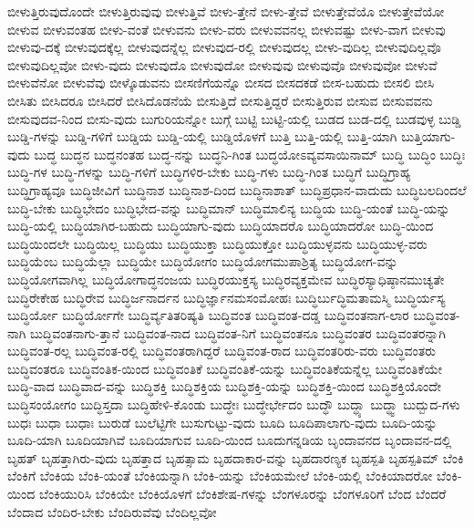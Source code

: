 {ಬೀಳುತ್ತಿರುವುದೊಂದೇ
ಬೀಳುತ್ತಿರುವುವು
ಬೀಳುತ್ತಿವೆ
ಬೀಳು-ತ್ತೇನೆ
ಬೀಳು-ತ್ತೇವೆ
ಬೀಳುತ್ತೇವೆಯೊ
ಬೀಳುತ್ತೇವೆಯೋ
ಬೀಳುವ
ಬೀಳುವಂತಹ
ಬೀಳು-ವಂತೆ
ಬೀಳುವನು
ಬೀಳು-ವರು
ಬೀಳುವವನಲ್ಲ
ಬೀಳುವಷ್ಟು
ಬೀಳು-ವಾಗ
ಬೀಳುವು
ಬೀಳುವು-ದಕ್ಕೆ
ಬೀಳುವುದಕ್ಕೆಲ್ಲ
ಬೀಳುವುದನ್ನೆಲ್ಲ
ಬೀಳುವುದ-ರಲ್ಲಿ
ಬೀಳುವುದಲ್ಲ
ಬೀಳು-ವುದಿಲ್ಲ
ಬೀಳುವುದಿಲ್ಲವೊ
ಬೀಳುವುದಿಲ್ಲವೋ
ಬೀಳು-ವುದು
ಬೀಳುವುದೊ
ಬೀಳುವುದೋ
ಬೀಳುವುವು
ಬೀಳುವುವೊ
ಬೀಳುವುವೋ
ಬೀಳುವೆ
ಬೀಳುವೆನೋ
ಬೀಳುವೆವು
ಬೀಳ್ಕೊಡುವನು
ಬೀಸಣಿಗೆಯನ್ನೊ
ಬೀಸದ
ಬೀಸದಕಡೆ
ಬೀಸ-ಬಹುದು
ಬೀಸಲಿ
ಬೀಸಿ
ಬೀಸಿತು
ಬೀಸಿದರೂ
ಬೀಸಿದರೆ
ಬೀಸಿದೊಡನೆಯೆ
ಬೀಸುತ್ತಿದೆ
ಬೀಸುತ್ತಿದ್ದರೆ
ಬೀಸುತ್ತಿರುವ
ಬೀಸುವ
ಬೀಸುವವನು
ಬೀಸುವುದವ-ನಿಂದ
ಬೀಸು-ವುದು
ಬುಗುರಿಯನ್ನೋ
ಬುಗ್ಗೆ
ಬುಟ್ಟಿ
ಬುಟ್ಟಿ-ಯಲ್ಲಿ
ಬುಡದ
ಬುಡ-ದಲ್ಲಿ
ಬುಡವುಳ್ಳ
ಬುಡ್ಡಿ
ಬುಡ್ಡಿ-ಗಳನ್ನು
ಬುಡ್ಡಿ-ಗಳಿಗೆ
ಬುಡ್ಡಿಯ
ಬುಡ್ಡಿ-ಯಲ್ಲಿ
ಬುಡ್ಡಿಯೊಳಗೆ
ಬುತ್ತಿ
ಬುತ್ತಿ-ಯಲ್ಲಿ
ಬುತ್ತಿ-ಯಾಗಿ
ಬುತ್ತಿಯಾಗು-ವುದು
ಬುದ್ಧ
ಬುದ್ಧನ
ಬುದ್ಧನಂತಹ
ಬುದ್ಧ-ನನ್ನು
ಬುದ್ಧನಿ-ಗಿಂತ
ಬುದ್ಧಯೋಽವ್ಯವಸಾಯಿನಾಮ್
ಬುದ್ಧಿ
ಬುದ್ಧಿಂ
ಬುದ್ಧಿಃ
ಬುದ್ಧಿ-ಗಳ
ಬುದ್ಧಿ-ಗಳನ್ನು
ಬುದ್ಧಿ-ಗಳಿಗೆ
ಬುದ್ಧಿಗಳಿರ-ಬೇಕು
ಬುದ್ಧಿ-ಗಳು
ಬುದ್ಧಿ-ಗಿಂತ
ಬುದ್ಧಿಗೆ
ಬುದ್ಧಿಗ್ರಾಹ್ಯ
ಬುದ್ಧಿಗ್ರಾಹ್ಯವೂ
ಬುದ್ಧಿಜೀವಿಗೆ
ಬುದ್ಧಿನಾಶ
ಬುದ್ಧಿನಾಶ-ದಿಂದ
ಬುದ್ಧಿನಾಶಾತ್
ಬುದ್ಧಿಪ್ರಧಾನ-ವಾದುದು
ಬುದ್ಧಿಬಲದಿಂದಲೆ
ಬುದ್ಧಿ-ಬೇಕು
ಬುದ್ಧಿಭೇದಂ
ಬುದ್ಧಿಭೇದ-ವನ್ನು
ಬುದ್ಧಿಮಾನ್
ಬುದ್ಧಿಮಾಲಿನ್ಯ
ಬುದ್ಧಿಯ
ಬುದ್ಧಿ-ಯಂತೆ
ಬುದ್ಧಿ-ಯನ್ನು
ಬುದ್ಧಿ-ಯಲ್ಲಿ
ಬುದ್ಧಿಯಾಗಿರ-ಬಹುದು
ಬುದ್ಧಿಯಾಗು-ವುದು
ಬುದ್ಧಿಯಾದರೊ
ಬುದ್ಧಿಯಾದರೋ
ಬುದ್ಧಿ-ಯಿಂದ
ಬುದ್ಧಿಯಿಂದಲೇ
ಬುದ್ಧಿಯಿಲ್ಲ
ಬುದ್ಧಿಯು
ಬುದ್ಧಿಯುಕ್ತಾ
ಬುದ್ಧಿಯುಕ್ತೋ
ಬುದ್ಧಿಯುಳ್ಳವನು
ಬುದ್ಧಿಯುಳ್ಳ-ವರು
ಬುದ್ಧಿಯೆಂಬ
ಬುದ್ಧಿಯೆಲ್ಲಾ
ಬುದ್ಧಿಯೇ
ಬುದ್ಧಿಯೋಗಂ
ಬುದ್ಧಿಯೋಗಮುಪಾಶ್ರಿತ್ಯ
ಬುದ್ಧಿಯೋಗ-ವನ್ನು
ಬುದ್ಧಿಯೋಗವಾಗಿಲ್ಲ
ಬುದ್ಧಿಯೋಗಾದ್ಧನಂಜಯ
ಬುದ್ಧಿರಯುಕ್ತಸ್ಯ
ಬುದ್ಧಿರವ್ಯಕ್ತಮೇವ
ಬುದ್ಧಿರಸ್ಯಾಧಿಷ್ಠಾನಮುಚ್ಯತೇ
ಬುದ್ಧಿರೇಕೇಹ
ಬುದ್ಧಿರೇವ
ಬುದ್ಧಿರ್ಜನಾರ್ದನ
ಬುದ್ಧಿರ್ಜ್ಞಾನಮಸಂಮೋಹಃ
ಬುದ್ಧಿರ್ಬುದ್ಧಿಮತಾಮಸ್ಮಿ
ಬುದ್ಧಿರ್ಯಸ್ಯ
ಬುದ್ಧಿರ್ಯೋ
ಬುದ್ಧಿರ್ಯೋಗೇ
ಬುದ್ಧಿರ್ವ್ಯತಿತರಿಷ್ಯತಿ
ಬುದ್ಧಿವಂತ
ಬುದ್ಧಿವಂತ-ದಡ್ಡ
ಬುದ್ಧಿವಂತನಾಗ-ಲಾರ
ಬುದ್ಧಿವಂತ-ನಾಗಿ
ಬುದ್ಧಿವಂತನಾಗು-ತ್ತಾನೆ
ಬುದ್ಧಿವಂತ-ನಾದ
ಬುದ್ಧಿವಂತ-ನಿಗೆ
ಬುದ್ಧಿವಂತನೂ
ಬುದ್ಧಿವಂತರ
ಬುದ್ಧಿವಂತರನ್ನಾಗಿ
ಬುದ್ಧಿವಂತ-ರಲ್ಲ
ಬುದ್ಧಿವಂತ-ರಲ್ಲಿ
ಬುದ್ಧಿವಂತರಾಗಿದ್ದರೆ
ಬುದ್ಧಿವಂತ-ರಾದ
ಬುದ್ಧಿವಂತರಿರು-ವರು
ಬುದ್ಧಿವಂತರು
ಬುದ್ಧಿವಂತರೂ
ಬುದ್ಧಿವಂತಿಕ-ಯಿಂದ
ಬುದ್ಧಿವಂತಿಕೆ
ಬುದ್ಧಿವಂತಿಕೆ-ಯನ್ನು
ಬುದ್ಧಿವಂತಿಕೆಯನ್ನೆಲ್ಲ
ಬುದ್ಧಿವಂತಿಕೆಯೇ
ಬುದ್ಧಿ-ವಾದ
ಬುದ್ಧಿವಾದ-ವನ್ನು
ಬುದ್ಧಿಶಕ್ತಿ
ಬುದ್ಧಿಶಕ್ತಿಯ
ಬುದ್ಧಿಶಕ್ತಿ-ಯನ್ನು
ಬುದ್ಧಿಶಕ್ತಿ-ಯಿಂದ
ಬುದ್ಧಿಶಕ್ತಿಯೊಂದೇ
ಬುದ್ಧಿಸಂಯೋಗಂ
ಬುದ್ಧಿಸ್ತದಾ
ಬುದ್ಧಿಹೇಳಿ-ಕೊಂಡು
ಬುದ್ಧೇಃ
ಬುದ್ಧೇರ್ಭೇದಂ
ಬುದ್ಧೌ
ಬುದ್ಧ್ಯಾ
ಬುದ್ಧ್ವಾ
ಬುದ್ಬುದ-ಗಳು
ಬುಧಃ
ಬುಧಾ
ಬುಧಾಃ
ಬುರುಡೆ
ಬುಲೆಟ್ಟಿಗೇ
ಬುಸುಗುಟ್ಟು-ವುದು
ಬೂದಿ
ಬೂದಿಪಾಲಾಗು-ವುದು
ಬೂದಿ-ಯನ್ನು
ಬೂದಿ-ಯಾಗಿ
ಬೂದಿಯಾಗಿವೆ
ಬೂದಿಯಾಗುವ
ಬೂದಿ-ಯಿಂದ
ಬೂದುಗನ್ನಡಿಯ
ಬೃಂದಾವನದ
ಬೃಂದಾವನ-ದಲ್ಲಿ
ಬೃಹತ್
ಬೃಹತ್ತಾಗಿರು-ವುದು
ಬೃಹತ್ತಾದ
ಬೃಹತ್ಸಾಮ
ಬೃಹದಾಕಾರ-ವನ್ನು
ಬೃಹದಾರಣ್ಯಕ
ಬೃಹಸ್ಪತಿ
ಬೃಹಸ್ಪತಿಮ್
ಬೆಂಕಿ
ಬೆಂಕಿಗೆ
ಬೆಂಕಿಯ
ಬೆಂಕಿ-ಯಂತೆ
ಬೆಂಕಿಯನ್ನಾಗಿ
ಬೆಂಕಿ-ಯನ್ನು
ಬೆಂಕಿಯಮೇಲೆ
ಬೆಂಕಿ-ಯಲ್ಲಿ
ಬೆಂಕಿಯಾದರೋ
ಬೆಂಕಿ-ಯಿಂದ
ಬೆಂಕಿಯುರಿಸಿ
ಬೆಂಕಿಯೇ
ಬೆಂಕಿಯೊಳಗೆ
ಬೆಂಕಿಶೇಷ-ಗಳನ್ನು
ಬೆಂಗಳೂರನ್ನು
ಬೆಂಗಳೂರಿಗೆ
ಬೆಂದ
ಬೆಂದರೆ
ಬೆಂದಾದ
ಬೆಂದಿರ-ಬೇಕು
ಬೆಂದಿರುವೆವು
ಬೆಂದಿಲ್ಲವೋ
}

